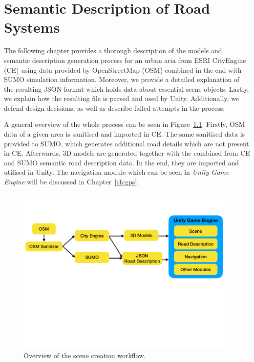 \chapter{Semantic Description of Road Systems}
\label{ch:descriptionOfRoadSystems}
The following chapter provides a thorough description of the models and semantic description generation process for an urban aria from ESRI CityEngine (CE) using data provided by OpenStreetMap (OSM) combined in the end with SUMO simulation information. Moreover, we provide a detailed explanation of the resulting JSON format which holds data about essential scene objects. Lastly, we explain how the resulting file is parsed and used by Unity. Additionally, we defend design decisions, as well as describe failed attempts in the process.

A general overview of the whole process can be seen in Figure~\ref{fig:overview}. Firstly, OSM data of a given area is sanitised and imported in CE. The same sanitised data is provided to SUMO, which generates additional road details which are not present in CE. Afterwards, 3D models are generated together with the combined from CE and SUMO semantic road description data. In the end, they are imported and utilised in Unity. The navigation module which can be seen in \emph{Unity Game Engine} will be discussed in Chapter~\ref{ch:gps}.

\begin{figure}[htb]
	\centering
	\includegraphics[width=0.95\linewidth]{figures/overview}
	\caption{Overview of the scene creation workflow.}
	\label{fig:overview}
\end{figure}

